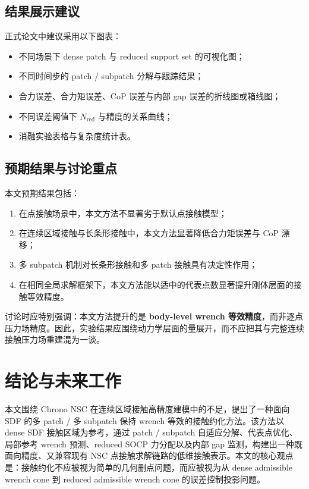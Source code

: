 \documentclass[UTF8,a4paper,11pt]{ctexart}
\begin{document}
\subsection{结果展示建议}

正式论文中建议采用以下图表：
\begin{itemize}[leftmargin=2em]
    \item 不同场景下 dense patch 与 reduced support set 的可视化图；
    \item 不同时间步的 patch / subpatch 分解与跟踪结果；
    \item 合力误差、合力矩误差、CoP 误差与内部 gap 误差的折线图或箱线图；
    \item 不同误差阈值下 $N_{\mathrm{red}}$ 与精度的关系曲线；
    \item 消融实验表格与复杂度统计表。
\end{itemize}

\subsection{预期结果与讨论重点}

本文预期结果包括：
\begin{enumerate}[label=(\arabic*)]
    \item 在点接触场景中，本文方法不显著劣于默认点接触模型；
    \item 在连续区域接触与长条形接触中，本文方法显著降低合力矩误差与 CoP 漂移；
    \item 多 subpatch 机制对长条形接触和多 patch 接触具有决定性作用；
    \item 在相同全局求解框架下，本文方法能以适中的代表点数显著提升刚体层面的接触等效精度。
\end{enumerate}

讨论时应特别强调：本文方法提升的是 \textbf{body-level wrench 等效精度}，而非逐点压力场精度。因此，实验结果应围绕动力学层面的量展开，而不应把其与完整连续接触压力场重建混为一谈。

\section{结论与未来工作}
\label{sec:conclusion}

本文围绕 Chrono NSC 在连续区域接触高精度建模中的不足，提出了一种面向 SDF 的多 patch / 多 subpatch 保持 wrench 等效的接触约化方法。该方法以 dense SDF 接触区域为参考，通过 patch / subpatch 自适应分解、代表点优化、局部参考 wrench 预测、reduced SOCP 力分配以及内部 gap 监测，构建出一种既面向精度、又兼容现有 NSC 点接触求解链路的低维接触表示。本文的核心观点是：接触约化不应被视为简单的几何删点问题，而应被视为从 dense admissible wrench cone 到 reduced admissible wrench cone 的误差控制投影问题。
\end{document}
